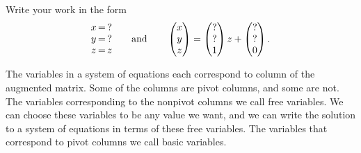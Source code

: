 \begin{problem}
\begin{enumerate}
Write your work in the form 
$$
 \begin{matrix} x\\y\\z \end{matrix}\,\begin{matrix} =\\=\\= \end{matrix}\,\begin{matrix} ? \\ ? \\ z \end{matrix}
\quad \quad \text{and}\quad \quad 
 \begin{pmatrix} x\\y\\z \end{pmatrix}=\begin{pmatrix} ? \\ ? \\ 1 \end{pmatrix}z+\begin{pmatrix} ?\\?\\0 \end{pmatrix}.
$$
 
\end{enumerate}

\end{problem}

\begin{definition}
 The variables in a system of equations each correspond to column of the augmented matrix. Some of the columns are pivot columns, and some are not.  The variables corresponding to the nonpivot columns we call free variables.  We can choose these variables to be any value we want, and we can write the solution to a system of equations in terms of these free variables. The variables that correspond to pivot columns we call basic variables. 
\end{definition}

